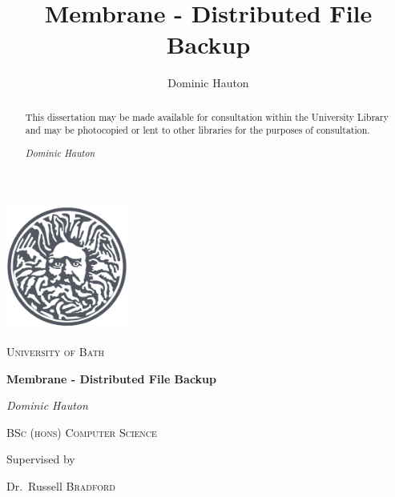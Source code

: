 \documentclass[11pt, a4paper, twocolumn, twoside]{report}
\title{Membrane - Distributed File Backup}
\author{Dominic Hauton}
\begin{document}
\begin{titlepage}
	\centering
	\includegraphics[width=0.3\textwidth]{uob-logo}\par\vspace{0.5cm}
	{\scshape\LARGE University of Bath \par}
	\vspace{3cm}
	{\huge\bfseries Membrane - Distributed File Backup\par}
	\vspace{1cm}
	{\Large\itshape Dominic Hauton\par}
	\vspace{1cm}
	{\scshape\Large BSc (hons) Computer Science\par}
	\vfill
	Supervised by\par
	Dr.~Russell \textsc{Bradford}

	\vspace{1cm}

	{\large \the\year\par}
\end{titlepage}

\renewcommand{\abstractname}{}
\begin{abstract}
This dissertation may be made available for consultation within the University
Library and may be photocopied or lent to other libraries for the purposes of consultation.

\vspace{0.5cm}
\noindent
\emph{Dominic Hauton}
\end{abstract}
\end{document}
